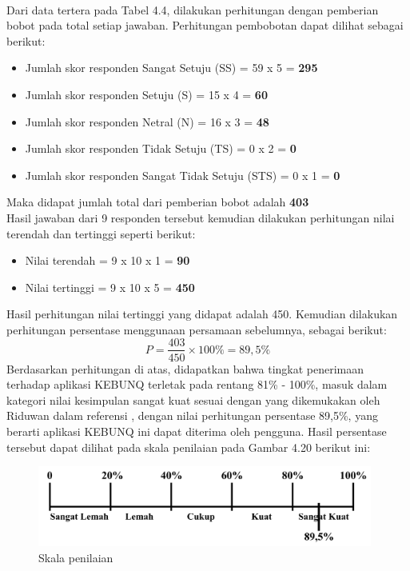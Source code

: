 \begin{flushleft}
\begin{justify}
            \noindent \\Dari data tertera pada Tabel 4.4, dilakukan perhitungan dengan pemberian bobot pada total setiap jawaban.
            Perhitungan pembobotan dapat dilihat sebagai berikut:
            \begin{itemize}
                \item Jumlah skor responden Sangat Setuju (SS) = 59 x 5 = \textbf{295}
                \item Jumlah skor responden Setuju (S)  = 15 x 4 = \textbf{60}
                \item Jumlah skor responden Netral (N)  = 16 x 3 = \textbf{48}
                \item Jumlah skor responden Tidak Setuju (TS)  = 0 x 2 = \textbf{0}
                \item Jumlah skor responden Sangat Tidak Setuju (STS)  = 0 x 1 = \textbf{0}
            \end{itemize}
            Maka didapat jumlah total dari pemberian bobot adalah \textbf{403}\\
            Hasil jawaban dari 9 responden tersebut kemudian dilakukan perhitungan nilai terendah dan tertinggi seperti berikut:
            \begin{itemize}
                \item Nilai terendah = 9 x 10 x 1 = \textbf{90}
                \item Nilai tertinggi = 9 x 10 x 5 = \textbf{450}
             \end{itemize}
             Hasil perhitungan nilai tertinggi yang didapat adalah 450. Kemudian dilakukan perhitungan persentase menggunaan persamaan sebelumnya, sebagai berikut:
             \begin{equation}
                P = \frac{403}{450} \times 100\% = 89,5\%
             \end{equation}
             Berdasarkan perhitungan di atas, didapatkan bahwa tingkat penerimaan terhadap aplikasi KEBUNQ terletak pada rentang 81\% - 100\%, 
             masuk dalam kategori nilai kesimpulan sangat kuat sesuai dengan yang dikemukakan oleh Riduwan dalam referensi \cite{kuantitatif}, dengan nilai perhitungan persentase
             89,5\%, yang berarti aplikasi KEBUNQ ini dapat diterima oleh pengguna. Hasil persentase tersebut dapat dilihat pada skala penilaian pada Gambar 4.20 berikut ini:
             \begin{figure}[ht]
                \centering
                \includegraphics[width=11cm]{images/bab 4/persentase.png}
                \caption{Skala penilaian}
            \end{figure}



\end{justify}
\end{flushleft}
